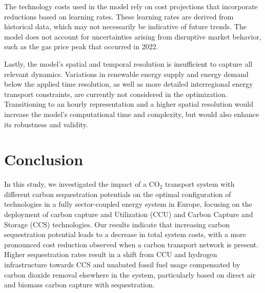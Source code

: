 \documentclass[twocolumn]{article}
\newcommand{\carbon}{CO$_2$}
\begin{document}
The technology costs used in the model rely on cost projections that incorporate reductions based on learning rates. These learning rates are derived from historical data, which may not necessarily be indicative of future trends. The model does not account for uncertainties arising from disruptive market behavior, such as the gas price peak that occurred in 2022.


Lastly, the model's spatial and temporal resolution is insufficient to capture all relevant dynamics. Variations in renewable energy supply and energy demand below the applied time resolution, as well as more detailed interregional energy transport constraints, are currently not considered in the optimization. Transitioning to an hourly representation and a higher spatial resolution would increase the model's computational time and complexity, but would also enhance its robustness and validity.

\section{Conclusion}
\label{sec:conclusion}

In this study, we investigated the impact of a \carbon{} transport system with different carbon sequestration potentials on the optimal configuration of technologies in a fully sector-coupled energy system in Europe, focusing on the deployment of carbon capture and Utilization (CCU) and Carbon Capture and Storage (CCS) technologies. Our results indicate that increasing carbon sequestration potential leads to a decrease in total system costs, with a more pronounced cost reduction observed when a carbon transport network is present. Higher sequestration rates result in a shift from CCU and hydrogen infrastructure towards CCS and unabated fossil fuel usage compensated by carbon dioxide removal elsewhere in the system, particularly based on direct air and biomass carbon capture with sequestration.
\end{document}
